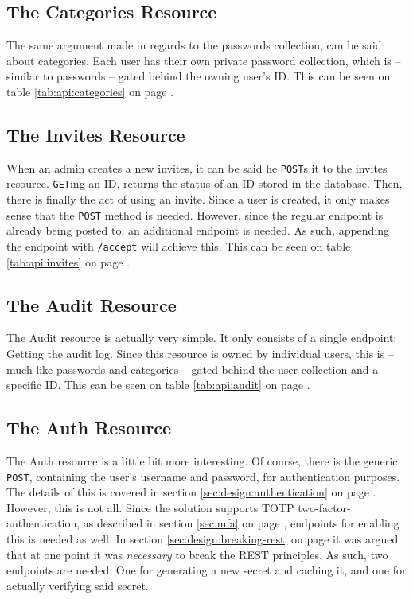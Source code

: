 		\subsection{The Categories Resource}
			The same argument made in regards to the passwords collection, can be said about categories. Each user has their own private password collection, which is -- similar to passwords -- gated behind the owning user's ID. This can be seen on table \ref{tab:api:categories} on page \pageref{tab:api:categories}.

		\subsection{The Invites Resource}
			When an admin creates a new invites, it can be said he \verb=POST=s it to the invites resource. \verb=GET=ing an ID, returns the status of an ID stored in the database. Then, there is finally the act of using an invite. Since a user is created, it only makes sense that the \verb=POST= method is needed. However, since the regular endpoint is already being posted to, an additional endpoint is needed. As such, appending the endpoint with \verb=/accept= will achieve this. This can be seen on table \ref{tab:api:invites} on page \pageref{tab:api:invites}.

		\subsection{The Audit Resource}
			The Audit resource is actually very simple. It only consists of a single endpoint; Getting the audit log. Since this resource is owned by individual users, this is -- much like passwords and categories -- gated behind the user collection and a specific ID. This can be seen on table \ref{tab:api:audit} on page \pageref{tab:api:audit}.

		\subsection{The Auth Resource}
			\label{sec:api:auth}
			The Auth resource is a little bit more interesting. Of course, there is the generic \verb=POST=, containing the user's username and password, for authentication purposes. The details of this is covered in section \ref{sec:design:authentication} on page \pageref{sec:design:authentication}. However, this is not all. Since the solution supports TOTP two-factor-authentication, as described in section \ref{sec:mfa} on page \pageref{sec:mfa}, endpoints for enabling this is needed as well. In section \ref{sec:design:breaking-rest} on page \pageref{sec:design:breaking-rest} it was argued that at one point it was \emph{necessary} to break the REST principles. As such, two endpoints are needed: One for generating a new secret and caching it, and one for actually verifying said secret. 


